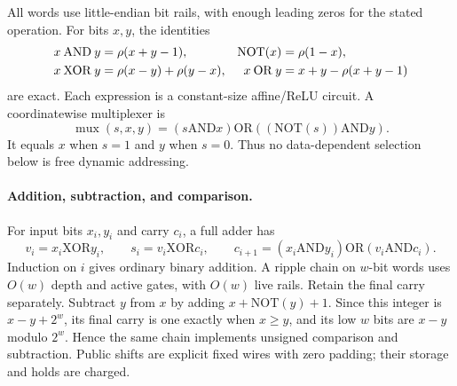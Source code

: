 All words use little-endian bit rails, with enough leading zeros for the
stated operation. For bits $x,y$, the identities
\begin{align}
 x\mathbin{\mathrm{AND}}y&=\rho(x+y-1),&
 \mathrm{NOT}(x)&=\rho(1-x),\notag\\
 x\mathbin{\mathrm{XOR}}y&=\rho(x-y)+\rho(y-x),&
 x\mathbin{\mathrm{OR}}y&=x+y-\rho(x+y-1)
 \label{eq:impl-boolean}
\end{align}
are exact. Each expression is a constant-size affine/ReLU circuit. A
coordinatewise multiplexer is
\begin{equation}\label{eq:impl-mux}
 \operatorname{mux}(s,x,y)
 = (s\mathbin{\mathrm{AND}}x)
      \mathbin{\mathrm{OR}}
   ((\mathrm{NOT}(s))\mathbin{\mathrm{AND}}y).
\end{equation}
It equals $x$ when $s=1$ and $y$ when $s=0$. Thus no data-dependent
selection below is free dynamic addressing.

\paragraph{Addition, subtraction, and comparison.}
For input bits $x_i,y_i$ and carry $c_i$, a full adder has
\[
 v_i=x_i\mathbin{\mathrm{XOR}}y_i,\qquad
 s_i=v_i\mathbin{\mathrm{XOR}}c_i,\qquad
 c_{i+1}=(x_i\mathbin{\mathrm{AND}}y_i)
             \mathbin{\mathrm{OR}}
            (v_i\mathbin{\mathrm{AND}}c_i).
\]
Induction on $i$ gives ordinary binary addition. A ripple chain on
$w$-bit words uses $O(w)$ depth and active gates, with $O(w)$ live rails.
Retain the final carry separately. Subtract $y$ from $x$ by adding
$x+\mathrm{NOT}(y)+1$. Since this integer is $x-y+2^w$, its final carry
is one exactly when $x\ge y$, and its low $w$ bits are $x-y$ modulo
$2^w$. Hence the same chain implements unsigned comparison and
subtraction. Public shifts are explicit fixed wires with zero padding;
their storage and holds are charged.

